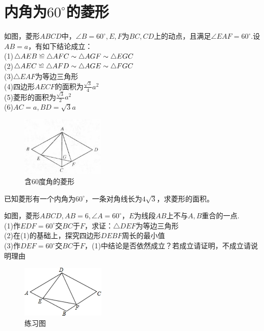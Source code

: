 \documentclass{ecnuthesis}
\newcommand\backcong{\mathrel{\reflectbox{$\cong$}}}
\begin{document}
\section{内角为$60^\circ$的菱形}
\begin{model}
    如图，菱形$ABCD$中，$\angle B=60^\circ,E,F$为$BC,CD$上的动点，且满足$\angle EAF=60^\circ$.设$AB=a$，有如下结论成立：\\
    (1)$\triangle AEB \backcong \triangle AFC \sim \triangle AGF \sim \triangle EGC$ \\
    (2)$\triangle AEC \backcong \triangle AFD \sim \triangle AGE \sim \triangle FGC$ \\
    (3)$\triangle EAF$为等边三角形 \\
    (4)四边形$AECF$的面积为$\frac{\sqrt3}{4}a^2$ \\
    (5)菱形的面积为$\frac{\sqrt3}{2}a^2$ \\
    (6)$AC=a,BD=\sqrt3a$
\end{model}
\begin{figure}[H]
\centering
\includegraphics[width=4cm]{picture/608.png}
\caption{含60度角的菱形}
\end{figure}
\begin{problem}
    已知菱形有一个内角为$60^\circ$，一条对角线长为$4\sqrt3$，求菱形的面积。
\end{problem}
\begin{problem}
    如图，菱形$ABCD,AB=6,\angle A=60^\circ$，$E$为线段$AB$上不与$A,B$重合的一点. \\
    (1)作$EDF=60^\circ$交$BC$于$F$，求证：$\triangle DEF$为等边三角形\\
    (2)在(1)的基础上，探究四边形$DEBF$周长的最小值 \\
    (3)作$DEF=60^\circ$交$BC$于$F$，(1)中结论是否依然成立？若成立请证明，不成立请说明理由 \\
\end{problem}
\begin{figure}[H]
\centering
\includegraphics[width=4cm]{picture/609.png}
\caption{练习图}
\end{figure}
\end{document}
